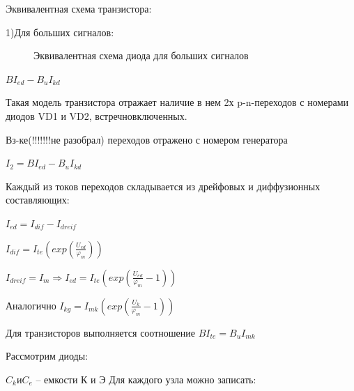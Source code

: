 \documentclass[12pt,a4paper]{article}
\begin{document}
Эквивалентная схема транзистора:

1)Для больших сигналов:
\begin{center}
\begin{figure}[h!]
		\caption{Эквивалентная схема диода для больших сигналов}	
		\label{ekvVD1}
	\end{figure}
\end{center}
$BI_{ed} - B_uI_{kd}$

Такая модель транзистора отражает наличие в нем 2х p-n-переходов с номерами диодов VD1 и VD2, встречновключенных.

Вз-ке(!!!!!!!не разобрал) переходов отражено с номером генератора

$I_2 = BI_{ed} - B_uI_{kd}$

Каждый из токов переходов складывается из дрейфовых и диффузионных составляющих:

$I_{ed} = I_{dif} - I_{dreif}$

$I_{dif} = I_{te}(exp(\frac{U_{ed}}{\varphi_m}))$

$I_{dreif}=I_m\Rightarrow I_{ed}=I_{te}(exp(\frac{U_{ed}}{\varphi_m}-1))$

Аналогично 
$I_{kg}=I_{mk}(exp(\frac{U_k}{\varphi_m}-1))$

Для транзисторов выполняется соотношение
$BI_{te} = B_uI_{mk}$

Рассмотрим диоды:
\begin{center}
\begin{figure}[h!]
		\label{VD}
	\end{figure}
\end{center}
$C_k и C_e$ – емкости К и Э
Для каждого узла можно записать:
\end{document}
